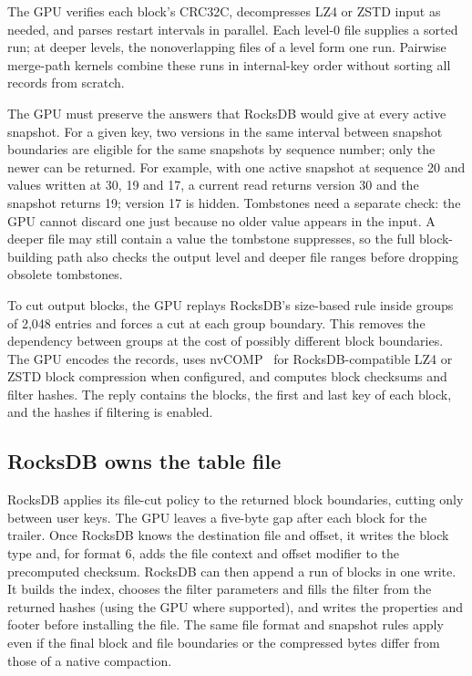 \documentclass[sigconf, nonacm]{acmart}
\begin{document}
The GPU verifies each block's CRC32C, decompresses LZ4 or ZSTD input as needed, and
parses restart intervals in parallel. Each level-0 file supplies a sorted run; at deeper
levels, the nonoverlapping files of a level form one run. Pairwise merge-path kernels
combine these runs in internal-key order without sorting all records from scratch.

The GPU must preserve the answers that RocksDB would give at every active snapshot.
For a given key, two versions in the same interval between snapshot boundaries
are eligible for the same snapshots by sequence number; only the newer can be
returned. For example, with one active snapshot at sequence 20 and values written
at 30, 19 and 17, a current read returns version 30 and the snapshot returns 19;
version 17 is hidden. Tombstones
need a separate check: the GPU cannot discard one just because no older value appears
in the input. A deeper file may still contain a value the tombstone suppresses, so the
full block-building path also checks the output level and deeper file ranges before
dropping obsolete tombstones.

To cut output blocks, the GPU replays RocksDB's size-based rule inside groups of
2,048 entries and forces a cut at each group boundary. This removes the dependency
between groups at the cost of possibly different block boundaries. The GPU encodes the
records, uses nvCOMP~\cite{nvcomp} for RocksDB-compatible LZ4 or ZSTD block compression
when configured, and computes block checksums and filter hashes. The reply contains the
blocks, the first and last key of each block, and the hashes if filtering is enabled.

\subsection{RocksDB owns the table file}

RocksDB applies its file-cut policy to the returned block boundaries, cutting only
between user keys. The GPU leaves a five-byte gap after each block for the trailer.
Once RocksDB knows the destination file and offset, it writes the block type and,
for format 6, adds the file context and offset modifier to the precomputed checksum.
RocksDB can then append a run of blocks in one write. It builds the index, chooses the
filter parameters and fills the filter from the returned hashes (using the GPU where
supported), and writes the properties and footer before installing the file. The
same file format and snapshot rules apply even if the final block and file boundaries
or the compressed bytes differ from those of a native compaction.
\end{document}
